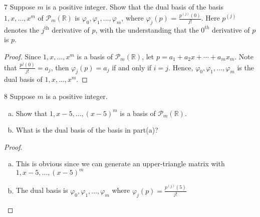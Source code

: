 \documentclass{article}
\newenvironment{problem}[1]{\begin{prob*}{#1}{}}{\end{prob*}}
\newcommand{\R}{\mathbb{R}}
\begin{document}
\begin{problem}{7}
Suppose $m$ is a positive integer. Show that the dual basis of the basis $1, x, \ldots,x^m$ of $\mathcal{P}_m(\R)$ is $\varphi_0, \varphi_1,\ldots, \varphi_{m}$, where $\varphi_j(p)$ = $\frac{p^{(j)}(0)}{j!}$. Here $p^{(j)}$ denotes the $j^{\text{th}}$ derivative of $p$, with the understanding that the $0^{\mathit{th}}$ derivative of $p$ is $p$.
\end{problem}
\begin{proof}
	Since $1, x, \ldots ,x^m$ is a basis of $\mathcal{P}_m(\mathbb{R})$, let $p = a_1 + a_2 x + \cdots + a_m x_m$. Note that $\frac{p^{j}(0)}{j!} = a_j$, then $\varphi_j(p) = a_j$ if and only if $i = j$. Hence, $\varphi_0, \varphi_1, \ldots, \varphi_m$ is the dual basis of $1, x, \ldots, x^m$.
\end{proof}
\begin{problem}{8}
Suppose $m$ is a positive integer.
\begin{enumerate}[(a)]
	\item Show that $1, x-5, \ldots , (x-5)^m$ is a basis of $\mathcal{P}_m(\mathbb{R})$.
	\item What is the dual basis of the basis in part(a)?
\end{enumerate}
\end{problem}
\begin{proof}
	\begin{enumerate}[(a)]
		\item This is obvious since we can generate an upper-triangle matrix with $1, x-5, \ldots , (x-5)^m$
		\item The dual basis is $\varphi_0, \varphi_1, \ldots, \varphi_m$ where $\varphi_j(p) = \frac{p^{(j)}(5)}{j!}$
	\end{enumerate}
\end{proof}
\end{document}
